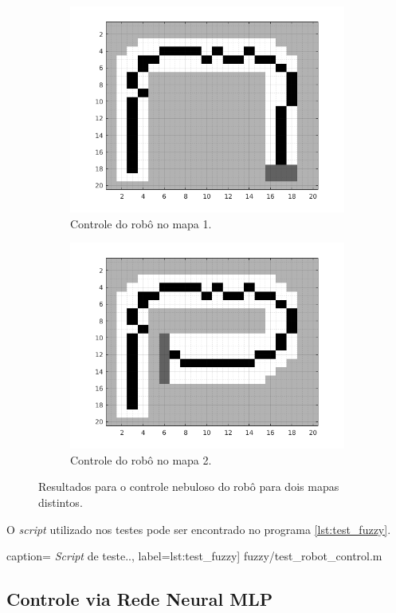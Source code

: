 	\begin{figure}[h!]
	
	\centering
	
		\begin{subfigure}{.5\textwidth}
		  \centering
		  \includegraphics[width=1\linewidth]{fuzzy/test1}
		  \caption{\centering Controle do robô no mapa 1.}
		  \label{fig:test_fuzzy_1}
		  
		\end{subfigure}%
		\begin{subfigure}{.5\textwidth}
		  \centering
		  \includegraphics[width=1\linewidth]{fuzzy/test2}
		  \caption{\centering Controle do robô no mapa 2.}
		  \label{fig:test_fuzzy_2} 
		\end{subfigure}
	
	
	\caption{Resultados para o controle nebuloso do robô
	para dois mapas distintos.}
	\end{figure}
	
	\FloatBarrier
		
	O \textit{script} utilizado nos testes pode ser encontrado no programa
	\ref{lst:test_fuzzy}.
	
	 caption={  
	\textit{Script} de teste..}, label={lst:test_fuzzy}]
	{fuzzy/test_robot_control.m}

	\subsection {Controle via Rede Neural MLP}